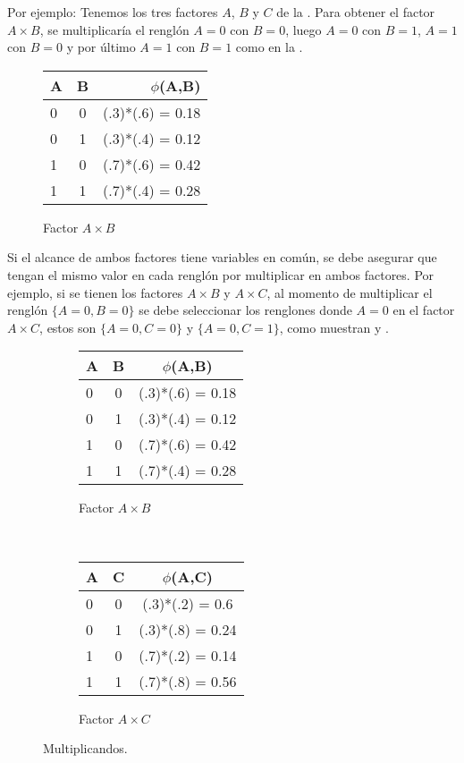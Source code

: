Por ejemplo: Tenemos los tres factores $A$, $B$ y $C$ de la . Para obtener el factor $A \times B$, se multiplicaría el renglón $A=0$ con $B=0$, luego $A=0$ con $B=1$, $A=1$ con $B=0$ y por último $A=1$ con $B=1$ como en la .

\begin{figure}[H]
  \begin{center}
    \begin{tabular}{ l  c | r }
      A & B & $\phi$(A,B)\\ \hline
      0 & 0 & (.3)*(.6) = 0.18 \\ \hline
      0 & 1 & (.3)*(.4) = 0.12 \\ \hline
      1 & 0 & (.7)*(.6) = 0.42 \\ \hline
      1 & 1 & (.7)*(.4) = 0.28 \\
    \end{tabular}
  \end{center}
  \caption{Factor $A \times B$}
  \label{fig:FactorAB}
\end{figure}

\noindent Si el alcance de ambos factores tiene variables en común, se debe asegurar que tengan el mismo valor en cada renglón por multiplicar en ambos factores. Por ejemplo, si se tienen los factores $A \times B$ y $A \times C$, al momento de multiplicar el renglón $\{A=0,B=0\}$ se debe seleccionar los renglones donde $A=0$ en el factor $A \times C$, estos son $\{A=0,C=0\}$ y $\{A=0,C=1\}$, como muestran  y .

\begin{figure}[h!]
    \centering
    \begin{subfigure}[b]{0.4\textwidth}
        \centering
        \begin{tabular}{ l  c | c }
          A & B & $\phi$(A,B)\\ \hline
          0 & 0 & (.3)*(.6) = 0.18 \\ \hline
          0 & 1 & (.3)*(.4) = 0.12 \\ \hline
          1 & 0 & (.7)*(.6) = 0.42 \\ \hline
          1 & 1 & (.7)*(.4) = 0.28 \\
        \end{tabular}
        \caption{Factor $A \times B$}
    \end{subfigure}
    ~ 
    \begin{subfigure}[b]{0.4\textwidth}
        \centering
        \begin{tabular}{ l  c | c }
          A & C & $\phi$(A,C)\\ \hline
          0 & 0 & (.3)*(.2) = 0.6 \\ \hline
          0 & 1 & (.3)*(.8) = 0.24 \\ \hline
          1 & 0 & (.7)*(.2) = 0.14 \\ \hline
          1 & 1 & (.7)*(.8) = 0.56 \\
        \end{tabular}
        \caption{Factor $A \times C$}
    \end{subfigure}
    \caption{Multiplicandos.}
    \label{fig:FAFB}
\end{figure}


